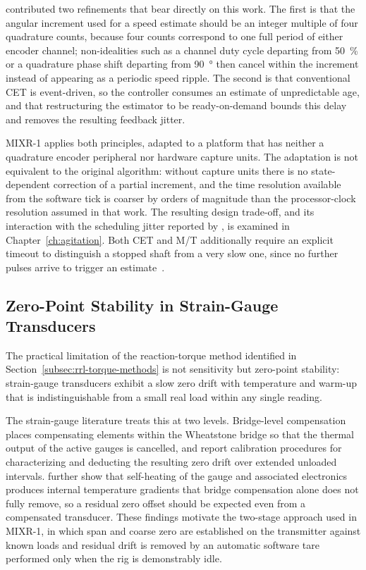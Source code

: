 \citet{anuchin2019} contributed two refinements that bear directly on this work. The first is that the angular increment used for a speed estimate should be an integer multiple of four quadrature counts, because four counts correspond to one full period of either encoder channel; non-idealities such as a channel duty cycle departing from \SI{50}{\percent} or a quadrature phase shift departing from \SI{90}{\degree} then cancel within the increment instead of appearing as a periodic speed ripple. The second is that conventional CET is event-driven, so the controller consumes an estimate of unpredictable age, and that restructuring the estimator to be ready-on-demand bounds this delay and removes the resulting feedback jitter.

MIXR-1 applies both principles, adapted to a platform that has neither a quadrature encoder peripheral nor hardware capture units. The adaptation is not equivalent to the original algorithm: without capture units there is no state-dependent correction of a partial increment, and the time resolution available from the software tick is coarser by orders of magnitude than the processor-clock resolution assumed in that work. The resulting design trade-off, and its interaction with the scheduling jitter reported by \citet{adam2021computers}, is examined in Chapter~\ref{ch:agitation}. Both CET and M/T additionally require an explicit timeout to distinguish a stopped shaft from a very slow one, since no further pulses arrive to trigger an estimate~\citep{anuchin2019}.

\subsection{Zero-Point Stability in Strain-Gauge Transducers}
\label{subsec:rrl-drift}

The practical limitation of the reaction-torque method identified in Section~\ref{subsec:rrl-torque-methods} is not sensitivity but zero-point stability: strain-gauge transducers exhibit a slow zero drift with temperature and warm-up that is indistinguishable from a small real load within any single reading.

The strain-gauge literature treats this at two levels. Bridge-level compensation places compensating elements within the Wheatstone bridge so that the thermal output of the active gauges is cancelled, and \citet{straingauge2023thermal} report calibration procedures for characterizing and deducting the resulting zero drift over extended unloaded intervals. \citet{loadcell2024thermal} further show that self-heating of the gauge and associated electronics produces internal temperature gradients that bridge compensation alone does not fully remove, so a residual zero offset should be expected even from a compensated transducer. These findings motivate the two-stage approach used in MIXR-1, in which span and coarse zero are established on the transmitter against known loads and residual drift is removed by an automatic software tare performed only when the rig is demonstrably idle.


